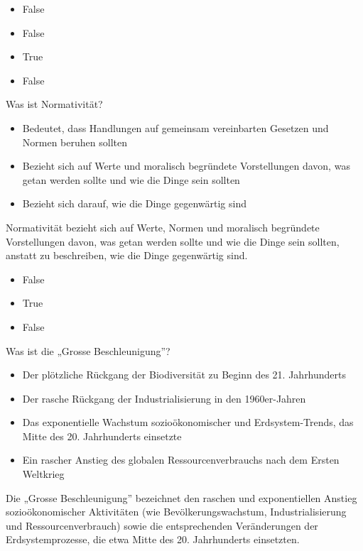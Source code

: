 \documentclass[
  nswissgerman,
  a4paper,
  DIV=11,
  numbers=noendperiod,
  oneside,
  openany]{scrreprt}
\providecommand{\tightlist}{%
  \setlength{\itemsep}{0pt}\setlength{\parskip}{0pt}}
\begin{document}
\begin{itemize}
\tightlist
\item
  False
\item
  False
\item
  True
\item
  False
\end{itemize}

Was ist Normativität?

\begin{itemize}
\tightlist
\item[$\square$]
  Bedeutet, dass Handlungen auf gemeinsam vereinbarten Gesetzen und
  Normen beruhen sollten
\item[$\square$]
  Bezieht sich auf Werte und moralisch begründete Vorstellungen davon,
  was getan werden sollte und wie die Dinge sein sollten
\item[$\square$]
  Bezieht sich darauf, wie die Dinge gegenwärtig sind
\end{itemize}

Normativität bezieht sich auf Werte, Normen und moralisch begründete
Vorstellungen davon, was getan werden sollte und wie die Dinge sein
sollten, anstatt zu beschreiben, wie die Dinge gegenwärtig sind.

\begin{itemize}
\tightlist
\item
  False
\item
  True
\item
  False
\end{itemize}

Was ist die „Grosse Beschleunigung''?

\begin{itemize}
\tightlist
\item[$\square$]
  Der plötzliche Rückgang der Biodiversität zu Beginn des 21.
  Jahrhunderts
\item[$\square$]
  Der rasche Rückgang der Industrialisierung in den 1960er-Jahren
\item[$\square$]
  Das exponentielle Wachstum sozioökonomischer und Erdsystem-Trends, das
  Mitte des 20. Jahrhunderts einsetzte
\item[$\square$]
  Ein rascher Anstieg des globalen Ressourcenverbrauchs nach dem Ersten
  Weltkrieg
\end{itemize}

Die „Grosse Beschleunigung'' bezeichnet den raschen und exponentiellen
Anstieg sozioökonomischer Aktivitäten (wie Bevölkerungswachstum,
Industrialisierung und Ressourcenverbrauch) sowie die entsprechenden
Veränderungen der Erdsystemprozesse, die etwa Mitte des 20. Jahrhunderts
einsetzten.
\end{document}

